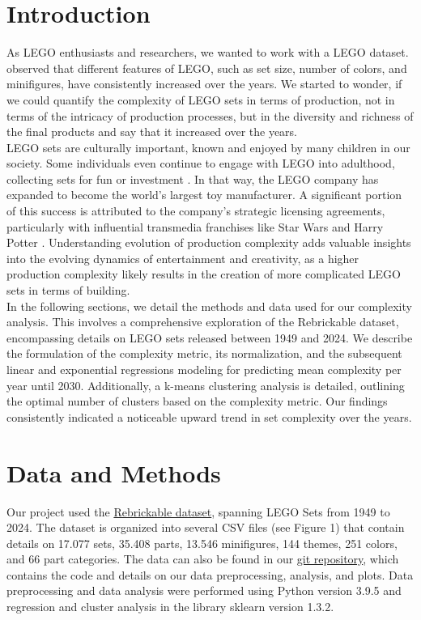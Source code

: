 \documentclass{article}
\theoremstyle{plain}
\theoremstyle{definition}
\theoremstyle{remark}
\begin{document}
\section{Introduction}\label{sec:intro}
As LEGO enthusiasts and researchers, we wanted to work with a LEGO dataset. \citet{legocomplexity} observed that different features of LEGO, such as set size, number of colors, and minifigures, have consistently increased over the years. We started to wonder, if we could quantify the complexity of LEGO sets in terms of production, not in terms of the intricacy of production processes, but in the diversity and richness of the final products and say that it increased over the years. \\
LEGO sets are culturally important, known and enjoyed by many children in our society. Some individuals even continue to engage with LEGO into adulthood, collecting sets for fun or investment \cite{dobrynskaya2018LEGO}. In that way, the LEGO company has expanded to become the world's largest toy manufacturer. A significant portion of this success is attributed to the company's strategic licensing agreements, particularly with influential transmedia franchises like Star Wars and Harry Potter \cite{mazzarella2019let}. Understanding evolution of production complexity adds valuable insights into the evolving dynamics of entertainment and creativity, as a higher production complexity likely results in the creation of more complicated LEGO sets in terms of building.\\
In the following sections, we detail the methods and data used for our complexity analysis. This involves a comprehensive exploration of the Rebrickable dataset, encompassing details on LEGO sets released between 1949 and 2024. We describe the formulation of the complexity metric, its normalization, and the subsequent linear and exponential regressions modeling for predicting mean complexity per year until 2030. Additionally, a k-means clustering analysis is detailed, outlining the optimal number of clusters based on the complexity metric. Our findings consistently indicated a noticeable upward trend in set complexity over the years.

\section{Data and Methods}\label{sec:methods}

Our project used the \href{https://rebrickable.com/downloads/}{Rebrickable dataset}, spanning LEGO Sets from 1949 to 2024. The dataset is organized into several CSV files (see Figure 1) that contain details on 17.077 sets, 35.408 parts, 13.546 minifigures, 144 themes, 251 colors, and 66 part categories. The data can also be found in our \href{https://github.com/eddiebeach99/Data_Literacy/tree/main}{git repository}, which contains the code and details on our data preprocessing, analysis, and plots. Data preprocessing and data analysis were performed using Python version 3.9.5 and regression and cluster analysis in the library sklearn version 1.3.2.
\end{document}
